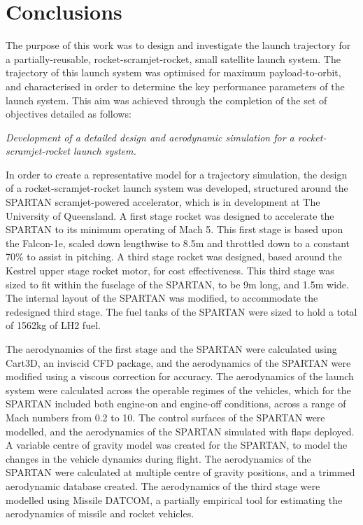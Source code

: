 
\cleardoublepage
\chapter{Conclusions}


The purpose of this work was to design and investigate the launch trajectory for a partially-reusable, rocket-scramjet-rocket, small satellite launch system. 
The trajectory of this launch system was optimised for maximum payload-to-orbit, and characterised in order to determine the key performance parameters of the launch system. 
This aim was achieved through the completion of the set of objectives detailed as follows:

	\emph{Development of a detailed design and aerodynamic simulation for a rocket-scramjet-rocket launch system.}
	
	In order to create a representative model for a trajectory simulation, the design of a rocket-scramjet-rocket launch system was developed, structured around the SPARTAN scramjet-powered accelerator, which is in development at The University of Queensland. A first stage rocket was designed to accelerate the SPARTAN to its minimum operating of Mach 5. This first stage is based upon the Falcon-1e, scaled down lengthwise to 8.5m and throttled down to a constant 70\% to assist in pitching.
	A third stage rocket was designed, based around the Kestrel upper stage rocket motor, for cost effectiveness. This third stage was sized to fit within the fuselage of the SPARTAN, to be 9m long, and 1.5m wide.   
The internal layout of the SPARTAN was modified, to accommodate the redesigned third stage. The fuel tanks of the SPARTAN were sized to hold a total of 1562kg of LH2 fuel. 

The aerodynamics of the first stage and the SPARTAN were calculated using Cart3D, an inviscid CFD package, and the aerodynamics of the SPARTAN were modified using a viscous correction for accuracy. The aerodynamics of the launch system were calculated across the operable regimes of the vehicles, which for the SPARTAN included both engine-on and engine-off conditions, across a range of Mach numbers from 0.2 to 10. The control surfaces of the SPARTAN were modelled, and the aerodynamics of the SPARTAN simulated with flaps deployed. A variable centre of gravity model was created for the SPARTAN, to model the changes in the vehicle dynamics during flight. The aerodynamics of the SPARTAN were calculated at multiple centre of gravity positions, and a trimmed aerodynamic database created. 
The aerodynamics of the third stage were modelled using Missile DATCOM, a partially empirical tool for estimating the aerodynamics of missile and rocket vehicles. 

